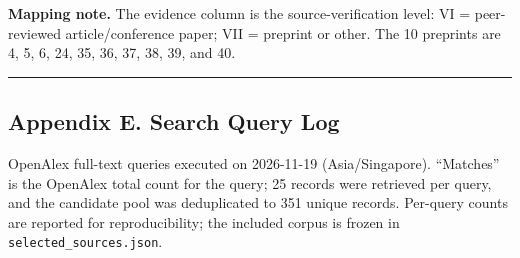 \documentclass[11pt]{article}
\begin{document}
\textbf{Mapping note.} The evidence column is the source-verification level: VI = peer-reviewed article/conference paper; VII = preprint or other. The 10 preprints are 4, 5, 6, 24, 35, 36, 37, 38, 39, and 40.

\par\medskip\hrule\medskip
\subsection*{Appendix E. Search Query Log}
OpenAlex full-text queries executed on 2026-11-19 (Asia/Singapore). “Matches” is the OpenAlex total count for the query; 25 records were retrieved per query, and the candidate pool was deduplicated to 351 unique records. Per-query counts are reported for reproducibility; the included corpus is frozen in \texttt{selected\_sources.json}.
\end{document}
